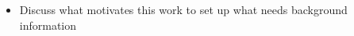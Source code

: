 \begin{itemize}
    \item Discuss what motivates this work to set up what needs background information
\end{itemize}